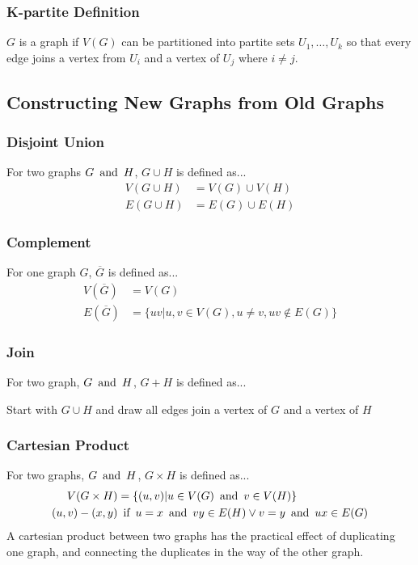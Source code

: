 \subsubsection*{K-partite Definition}
$G$ is a  graph if $V(G)$ can be partitioned into partite sets $U_1, \ldots, U_k$ so that every edge joins a vertex from $U_i$ and a vertex of $U_j$ where $i \neq j$.

\subsection*{Constructing New Graphs from Old Graphs}
\subsubsection*{Disjoint Union}
For two graphs $G \operatorname{~\text{and}~} H$, $G \cup H$ is defined as...
\begin{align*}
    V(G \cup H) & = V(G) \cup V(H) \\
    E(G \cup H) & = E(G) \cup E(H)
\end{align*}

\subsubsection*{Complement}
For one graph $G$, $\overline{G}$ is defined as...
\begin{align*}
    V(\overline{G}) & = V(G)                                            \\
    E(\overline{G}) & = \{uv | u,v \in V(G), u \neq v, uv \notin E(G)\}
\end{align*}

\subsubsection*{Join}
For two graph, $G \operatorname{~\text{and}~} H$, $G + H$ is defined as...
\begin{center}
    Start with $G \cup H$ and draw all edges join a vertex of $G$ and a vertex of $H$
\end{center}

\subsubsection*{Cartesian Product}
For two graphs, $G \operatorname{~\text{and}~} H$, $G \times H$ is defined as...
\begin{align*}
    V(G \times H) & = \{(u,v) | u \in V(G) \operatorname{~\text{and}~} v \in V(H)\}                 \\
    (u,v)-(x,y)   & \operatorname{~\text{if}~} u = x \operatorname{~\text{and}~} vy \in E(H) \lor v = y \operatorname{~\text{and}~} ux \in E(G)
\end{align*}
A cartesian product between two graphs has the practical effect of duplicating one graph, and connecting the duplicates in the way of the other graph.

